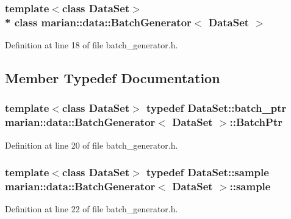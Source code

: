 \subsubsection*{template$<$class Data\+Set$>$\\*
class marian\+::data\+::\+Batch\+Generator$<$ Data\+Set $>$}



Definition at line 18 of file batch\+\_\+generator.\+h.



\subsection{Member Typedef Documentation}
\subsubsection[{\texorpdfstring{Batch\+Ptr}{BatchPtr}}]{\setlength{\rightskip}{0pt plus 5cm}template$<$class Data\+Set$>$ typedef Data\+Set\+::batch\+\_\+ptr {\bf marian\+::data\+::\+Batch\+Generator}$<$ Data\+Set $>$\+::{\bf Batch\+Ptr}}\hypertarget{classmarian_1_1data_1_1BatchGenerator_ae876f1ada46b7e7e3a4ea0ad45e9ee39}{}\label{classmarian_1_1data_1_1BatchGenerator_ae876f1ada46b7e7e3a4ea0ad45e9ee39}


Definition at line 20 of file batch\+\_\+generator.\+h.

\subsubsection[{\texorpdfstring{sample}{sample}}]{\setlength{\rightskip}{0pt plus 5cm}template$<$class Data\+Set$>$ typedef Data\+Set\+::sample {\bf marian\+::data\+::\+Batch\+Generator}$<$ Data\+Set $>$\+::{\bf sample}}\hypertarget{classmarian_1_1data_1_1BatchGenerator_a6c7a80f1880a4ff6bfd3c99cef335855}{}\label{classmarian_1_1data_1_1BatchGenerator_a6c7a80f1880a4ff6bfd3c99cef335855}


Definition at line 22 of file batch\+\_\+generator.\+h.

